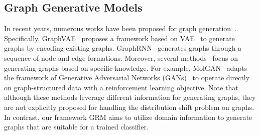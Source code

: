 







\subsection{Graph Generative Models}
In recent years, numerous works have been proposed for graph generation~\citep{you2018graphrnn,grover2019graphite}. Specifically, GraphVAE~\citep{simonovsky2018graphvae} proposes a framework based on VAE~\citep{kingma2013auto} to generate graphs by encoding existing graphs. GraphRNN~\citep{you2018graphrnn} generates graphs through a sequence of node and edge formations. Moreover, several methods~\citep{jin2018junction,preuer2018frechet} focus on generating graphs based on specific knowledge. For example, MolGAN~\citep{de2018molgan} adapts the framework of Generative Adversarial Networks
(GANs)~\citep{goodfellow2014generative} to operate directly on graph-structured data with a reinforcement learning objective. Note that although these methods leverage different information for generating graphs, they are not explicitly proposed for handling the distribution shift problem on graphs. In contrast, our framework GRM aims to utilize domain information to generate graphs that are suitable for a trained classifier. 

